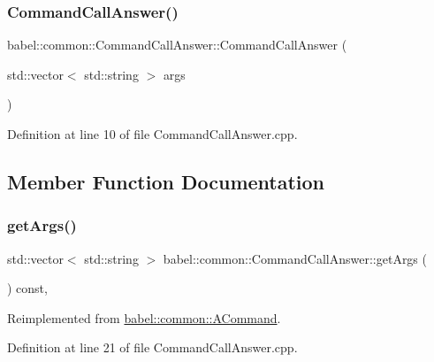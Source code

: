 \subsubsection{\texorpdfstring{Command\+Call\+Answer()}{CommandCallAnswer()}}
{\footnotesize\ttfamily babel\+::common\+::\+Command\+Call\+Answer\+::\+Command\+Call\+Answer (\begin{DoxyParamCaption}\item[{std\+::vector$<$ std\+::string $>$}]{args }\end{DoxyParamCaption})}



Definition at line 10 of file Command\+Call\+Answer.\+cpp.



\subsection{Member Function Documentation}
\mbox{\label{classbabel_1_1common_1_1_command_call_answer_a5c1c304db1d62ce4a1c231c10daaa58a}} 
\subsubsection{\texorpdfstring{get\+Args()}{getArgs()}}
{\footnotesize\ttfamily std\+::vector$<$ std\+::string $>$ babel\+::common\+::\+Command\+Call\+Answer\+::get\+Args (\begin{DoxyParamCaption}{ }\end{DoxyParamCaption}) const\hspace{0.3cm}{\ttfamily [override]}, {\ttfamily [virtual]}}



Reimplemented from \mbox{\hyperlink{classbabel_1_1common_1_1_a_command_a67b110bc98f6c47b0739c6eba9a5432e}{babel\+::common\+::\+A\+Command}}.



Definition at line 21 of file Command\+Call\+Answer.\+cpp.

\mbox{\label{classbabel_1_1common_1_1_command_call_answer_abfe3cbfe8665fe36f079bfed2e5d8c79}} 
